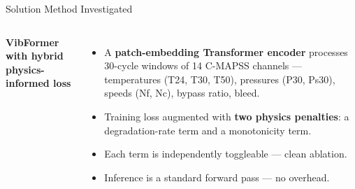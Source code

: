 \documentclass[10pt, aspectratio=169, handout]{beamer}
\begin{document}
\begin{frame}{Solution Method Investigated}
  \begin{columns}[T]
      \textbf{VibFormer with hybrid physics-informed loss}\\[8pt]
      \small
      \begin{itemize}
        \setlength\itemsep{4pt}
        \item<1-> A \textbf{patch-embedding Transformer encoder} processes 30-cycle windows
              of 14 C-MAPSS channels --- temperatures (T24, T30, T50),
              pressures (P30, Ps30), speeds (Nf, Nc), bypass ratio, bleed.
        \item<2-> Training loss augmented with \textbf{two physics penalties}:
              a degradation-rate term and a monotonicity term.
        \item<3-> Each term is independently toggleable --- clean ablation.
        \item<4-> Inference is a standard forward pass --- no overhead.
      \end{itemize}
      \vspace{6pt}

  \end{columns}
\end{frame}
\end{document}

